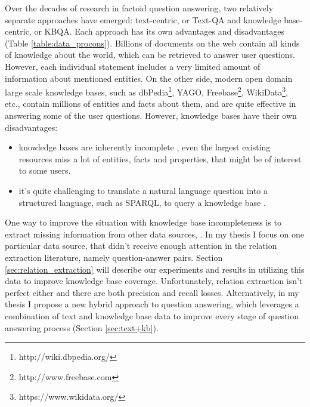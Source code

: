 %

\newif\ifcompress
\compresstrue   %
\compressfalse %

\label{chap:factoid}

\noindent

Over the decades of research in factoid question answering, two relatively separate approaches have emerged: text-centric, or Text-QA and knowledge base-centric, or KBQA.
Each approach has its own advantages and disadvantages (Table \ref{table:data_procons}).
Billions of documents on the web contain all kinds of knowledge about the world, which can be retrieved to answer user questions.
However, each individual statement includes a very limited amount of information about mentioned entities.
On the other side, modern open domain large scale knowledge bases, such as dbPedia\footnote{http://wiki.dbpedia.org/}, YAGO\cite{yago3}, Freebase\footnote{http://www.freebase.com}, WikiData\footnote{https://www.wikidata.org/}, etc., contain millions of entities and facts about them, and are quite effective in answering some of the user questions.
However, knowledge bases have their own disadvantages:
\begin{itemize}
\item knowledge bases are inherently incomplete \cite{Dong:2014:KVW:2623330.2623623}, even the largest existing resources miss a lot of entities, facts and properties, that might be of interest to some users.
\item it's quite challenging to translate a natural language question into a structured language, such as SPARQL, to query a knowledge base \cite{BerantCFL13:sempre}.
\end{itemize}

One way to improve the situation with knowledge base incompleteness is to extract missing information from other data sources, \eg \cite{Cafarella:2008:WEP:1453856.1453916,Cafarella:2009:WES:1519103.1519112,Dong:2014:KVW:2623330.2623623,Etzioni:2008:OIE:1409360.1409378,Gupta:2014:BOS:2732286.2732288,kushmerick1997wrapper}.
In my thesis I focus on one particular data source, that didn't receive enough attention in the relation extraction literature, namely question-answer pairs.
Section \ref{sec:relation_extraction} will describe our experiments and results in utilizing this data to improve knowledge base coverage.
Unfortunately, relation extraction isn't perfect either and there are both precision and recall losses.
Alternatively, in my thesis I propose a new hybrid approach to question answering, which leverages a combination of text and knowledge base data to improve every stage of question answering process (Section \ref{sec:text+kb}).

